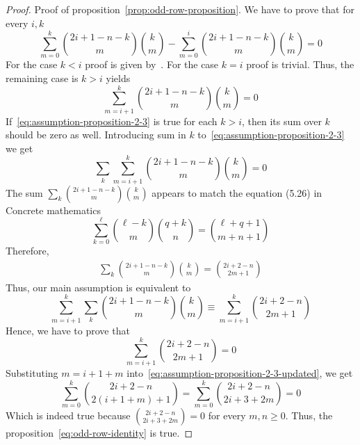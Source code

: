 \begin{proof}
    Proof of proposition~\eqref{prop:odd-row-proposition}.
    We have to prove that for every $i,k$
    \begin{equation*}
        \sum_{m=0}^{k} \binom{2i+1-n-k}{m} \binom{k}{m} - \sum_{m=0}^{i} \binom{2i+1-n-k}{m} \binom{k}{m} = 0
    \end{equation*}
    For the case $k<i$ proof is given by~\cite[proposition 6.0.1]{gregory2023iterated}.
    For the case $k=i$ proof is trivial.
    Thus, the remaining case is $k>i$ yields
    \begin{equation}
        \sum_{m=i+1}^{k} \binom{2i+1-n-k}{m} \binom{k}{m} = 0
        \label{eq:assumption-proposition-2-3}
    \end{equation}
    If~\eqref{eq:assumption-proposition-2-3} is true for each $k>i$, then its sum over $k$ should be zero as well.
    Introducing sum in $k$ to~\eqref{eq:assumption-proposition-2-3} we get
    \begin{equation*}
        \sum_{k} \sum_{m=i+1}^{k} \binom{2i+1-n-k}{m} \binom{k}{m} = 0
    \end{equation*}
    The sum $\sum_{k} \binom{2i+1-n-k}{m} \binom{k}{m}$ appears to match the equation (5.26) in
    Concrete mathematics~\cite[eq. 5.26]{graham1994concrete}
    \begin{equation}
        \sum_{k=0}^{\ell} \binom{\ell-k}{m} \binom{q+k}{n} = \binom{\ell+q+1}{m+n+1}
        \label{eq:concrete-mathematics-5-26}
    \end{equation}
    Therefore,
    \begin{align*}
        \sum_{k} \binom{2i+1-n-k}{m} \binom{k}{m} = \binom{2i+2-n}{2m+1}
    \end{align*}
    Thus, our main assumption is equivalent to
    \begin{equation*}
        \sum_{m=i+1}^{k} \sum_{k} \binom{2i+1-n-k}{m} \binom{k}{m} \equiv \sum_{m=i+1}^{k} \binom{2i+2-n}{2m+1}
    \end{equation*}
    Hence, we have to prove that
    \begin{equation}
        \sum_{m=i+1}^{k} \binom{2i+2-n}{2m+1} = 0\label{eq:assumption-proposition-2-3-updated}
    \end{equation}
    Substituting $m=i+1+m$ into~\eqref{eq:assumption-proposition-2-3-updated}, we get
    \begin{equation*}
        \sum_{m=0}^{k} \binom{2i+2-n}{2(i+1+m)+1} = \sum_{m=0}^{k} \binom{2i+2-n}{2i+3+2m} = 0
    \end{equation*}
    Which is indeed true because $\binom{2i+2-n}{2i+3+2m}=0$ for every $m,n \geq 0$.
    Thus, the proposition~\eqref{eq:odd-row-identity} is true.
\end{proof}


